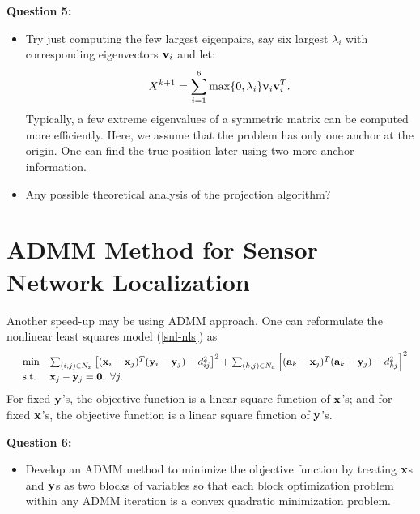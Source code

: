 \documentclass[10pt]{article}
\newcommand\x{{\bf x}}
\newcommand\y{{\bf y}}
\newcommand\bz{{\bf 0}}
\renewcommand\a{{\bf a}}
\renewcommand\v{{\bf v}}
\begin{document}
{\bf Question 5:}
\begin{itemize} 
\item Try just computing the few largest eigenpairs, say six largest $\lambda_i$ with corresponding eigenvectors $\v_i$ and let:
\[X^{k+1}=\sum_{i=1}^6\max\{0,\lambda_i\}\v_i\v_i^T.\]
Typically, a few extreme eigenvalues of a symmetric matrix can be computed more efficiently.
Here, we assume that the problem has only one anchor at the origin. One can find the true
position later using two more anchor information.

\item Any possible theoretical analysis of the projection algorithm? 
\end{itemize}


\section{ADMM Method for Sensor Network Localization}
Another speed-up may be using ADMM approach. One can reformulate the nonlinear least squares model (\ref{snl-nls}) as
\begin{equation}\label{snl-nls-xy}
\begin{array}{lll}
&\min        & \sum_{(i,j)\in N_x}\left[(\x_i-\x_j)^T(\y_i-\y_j) - d_{ij}^2\right]^2+\sum_{(k,j)\in N_a} \left[(\a_k-\x_j)^T(\a_k-\y_j) - d_{kj}^2\right]^2\\
&\mbox{s.t.}& \x_j-\y_j=\bz,\ \forall j.
\end{array}
\end{equation}
For fixed $\y$'s, the objective function is a linear square function of $\x$'s; and for fixed $\x$'s,  the objective function is a linear square function of $\y$'s.

{\bf Question 6:} 
\begin{itemize} 
\item Develop an ADMM method to minimize the objective function by treating $\x$s and $\y$s as two blocks of variables so that each block optimization problem within any ADMM iteration is a convex quadratic minimization problem.
\end{itemize}
\end{document}
